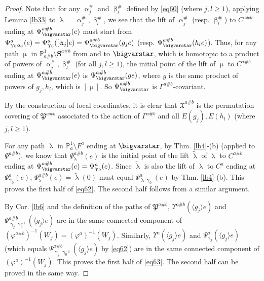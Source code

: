 \documentclass[12pt,a4paper,notitlepage]{article}
\theoremstyle{definition}
\theoremstyle{plain}
\newcommand{\fk}{\mathfrak}
\newcommand{\wtd}{\widetilde}
\newcommand{\bk}[1]{\langle {#1}\rangle}
\newcommand{\Pbb}{\mathbb P}
\newcommand{\Sbf}{\mathbf{S}}
\numberwithin{equation}{subsection}
\begin{document}
\begin{proof}
Note that for any $\upalpha_j^\#$ and $\upbeta_l^\#$ defined by \eqref{eq60} (where $j,l\geq 1$), applying  Lemma \ref{lb33} to $\uplambda=\upalpha_j^\#,\upbeta_l^\#$, we see that the lift of $\upalpha_j^\#$ (resp. $\upbeta_l^\#$) to $C^{a\#b}$ ending at $\Psi_\bigvarstar^{a\#b}(e)$ must start from $\Psi^a_{\upgamma_0\upalpha_j}(e)=\Psi^a_{\upgamma_0}([\upalpha_j]e)=\Psi^{a\#b}_\bigvarstar(g_je)$ (resp. $\Psi^{a\#b}_\bigvarstar(h_le)$). Thus, for any path $\upmu$ in $\Pbb^1_{a\#b}\setminus\Sbf^{a\#b}$ from and to $\bigvarstar$, which is homotopic to a product of powers of $\upalpha_j^\#,\upbeta_l^\#$ (for all $j,l\geq 1$), the initial point of the lift of $\upmu$ to $C^{a\#b}$ ending at $\Psi^{a\#b}_\bigvarstar(e)$ is  $\Psi^{a\#b}_\bigvarstar(ge)$, where $g$ is the same product of powers of $g_j,h_l$, which is $[\upmu]$. So $\Psi^{a\#b}_\bigvarstar$ is $\Gamma^{a\#b}$-covariant. 

By the construction of local coordinates, it is clear that  $\fk X^{a\#b}$ is the permutation covering of $\fk P^{a\#b}$ associated to the action of $\Gamma^{a\#b}$ and all $E(g_j),E(h_l)$ (where $j,l\geq 1$).




For any path $\uplambda$ in $\Pbb^1_a\setminus F^a$ ending at $\bigvarstar$, by Thm. \ref{lb4}-(b) (applied to $\Psi^{a\#b}$), we know that $\Psi_\uplambda^{a\#b}(e)$ is the initial point of the lift $\wtd\uplambda$ of $\uplambda$ to $C^{a\#b}$ ending at $\Psi^{a\#b}_\bigvarstar(e)=\Psi^a_{\upgamma_0}(e)$. Since $\wtd\uplambda$ is also the lift of $\uplambda$ to $C^a$  ending at $\Psi^a_{\upgamma_0}(e)$,  $\Psi_\uplambda^{a\#b}(e)=\wtd\uplambda(0)$ must equal $\Psi^a_{\uplambda\upgamma_0}(e)$ by Thm. \ref{lb4}-(b).   This proves the first half of \eqref{eq62}. The second half follows from a similar argument. 

By Cor. \ref{lb6} and the definition of the paths of $\fk P^{a\#b}$, $\Upsilon^{a\#b}(\bk{g_j}e)$ and $\Psi^{a\#b}_{\upgamma_j\upgamma_0^{-1}}(\bk{g_j}e)$ are in the same connected component of $(\varphi^{a\#b})^{-1}(W_j)=(\varphi^a)^{-1}(W_j)$. Similarly, $\Upsilon^a(\bk{g_j}e)$ and  $\Psi^a_{\upgamma_j}(\bk{g_j}e)$ (which equals $\Psi^{a\#b}_{\upgamma_j\upgamma_0^{-1}}(\bk{g_j}e)$ by \eqref{eq62}) are in the same connected component of $(\varphi^a)^{-1}(W_j)$. This proves the first half of \eqref{eq63}. The second half can be proved in the same way.
\end{proof}
\end{document}

